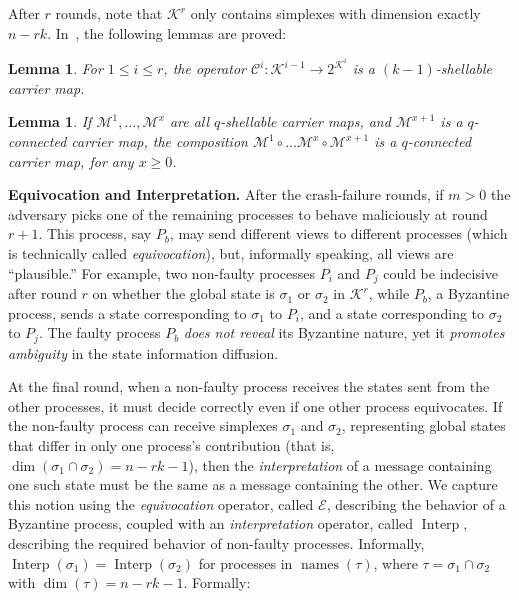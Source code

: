 \documentclass[11pt]{article}
\newcommand{\cC}{\ensuremath{\mathcal{C}}}
\newcommand{\cE}{\ensuremath{\mathcal{E}}}
\newcommand{\cK}{\ensuremath{\mathcal{K}}}
\newcommand{\cM}{\ensuremath{\mathcal{M}}}
\DeclareMathOperator{\names}{names}\DeclareMathOperator{\name}{name}\DeclareMathOperator{\sgn}{sgn}
\newtheorem{lemma}[theorem]{Lemma}
\DeclareMathOperator{\interp}{Interp}
\begin{document}
After $r$ rounds,
note that $\cK^r$ only contains simplexes with dimension exactly $n -rk$.
In~\cite{ConcurrentShellable,MauriceBook},
the following lemmas are proved:

\begin{lemma}
\label{lemma-crashshellable}
For $1 \le i \le r$,
the operator $\cC^i: \cK^{i-1} \to 2^{\cK^i}$ is a $(k - 1)$-shellable carrier map.
\end{lemma}


\begin{lemma}
\label{lemma-compositionshellable}
If $\cM^1, \ldots, \cM^x$ are all $q$-shellable carrier maps,
and $\cM^{x+1}$ is a $q$-connected carrier map,
the composition $\cM^1 \circ \ldots \cM^x \circ \cM^{x+1}$ is a $q$-connected carrier map,
for any $x \ge 0$.
\end{lemma}


\textbf{Equivocation and Interpretation. }
After the crash-failure rounds,
if $m > 0$
the adversary picks one of the remaining processes to behave maliciously at round $r + 1$.
This process, say $P_b$, may send different views to different processes
(which is technically called \emph{equivocation}),
but,
informally speaking,
all views are ``plausible.''
For example,
two non-faulty processes $P_i$ and $P_j$
could be indecisive after round $r$ on whether the global state
is $\sigma_1$ or $\sigma_2$ in $\cK^r$,
while $P_b$,
a Byzantine process,
sends a state corresponding to $\sigma_1$ to $P_i$,
and a state corresponding to $\sigma_2$ to $P_j$.
The faulty process $P_b$ \emph{does not reveal} its Byzantine nature,
yet it \emph{promotes ambiguity} in the state information diffusion.

At the final round,
when a non-faulty process receives the states sent from the other processes,
it must decide correctly even if one other process equivocates.
If the non-faulty process can receive simplexes $\sigma_1$ and $\sigma_2$,
representing global states that differ in only one process's contribution
(that is, $\dim(\sigma_1 \cap \sigma_2) = n -rk - 1$),
then the \emph{interpretation} of a message containing one such state
must be the same as a message containing the other.
We capture this notion using the \emph{equivocation} operator,
called $\cE$,
describing the behavior of a Byzantine process,
coupled with an \emph{interpretation} operator,
called $\interp$,
describing the required behavior of non-faulty processes.
Informally,
$\interp(\sigma_1) = \interp(\sigma_2)$
for processes in $\names(\tau)$,
where $\tau = \sigma_1 \cap \sigma_2$ with $\dim(\tau) = n -rk - 1$.
Formally:
\end{document}
